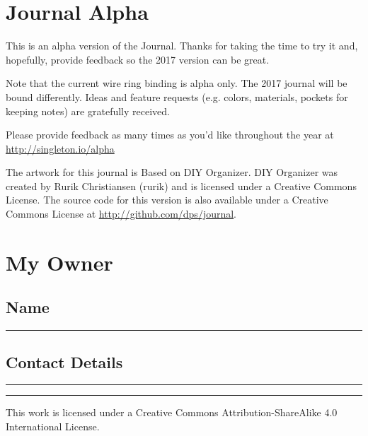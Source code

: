 \section{Journal Alpha}

This is an alpha version of the Journal.  Thanks for taking the time to try it and, hopefully, provide feedback so the 2017 version can be great.

Note that the current wire ring binding is alpha only.  The 2017 journal will be bound differently.  Ideas and feature requests (e.g. colors, materials, pockets for keeping notes) are gratefully received.

Please provide feedback as many times as you'd like throughout the year at \url{http://singleton.io/alpha}

The artwork for this journal is Based on DIY Organizer.  DIY Organizer was created by Rurik Christiansen (rurik) and is licensed under a Creative Commons License.  The source code for this version is also available under a Creative Commons License at \url{http://github.com/dps/journal}.

\section{My Owner}

\subsection{Name}
{\color{WriteBgMain}
\rule{\textwidth}{1pt}\par}

\subsection{Contact Details}
{\color{WriteBgMain}
\rule{\textwidth}{1pt}\par
\rule{\textwidth}{1pt}\par}

\pagebreak
This work is licensed under a Creative Commons Attribution-ShareAlike 4.0 International License.
\pagebreak
